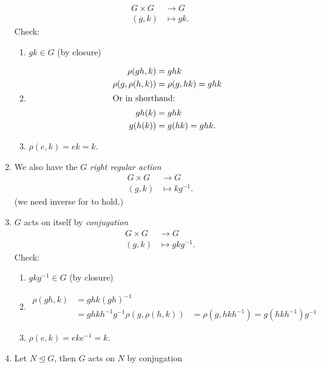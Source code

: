 \begin{example}
\begin{enumerate}
        \begin{align*}
            G \times G &\to G \\
            (g, k) &\mapsto gk.
        \end{align*} 
        Check:
        \begin{enumerate} \addtocounter{enumii}{-1}
            \item $gk \in G$ (by closure)
            \item
            \begin{align*}
                \rho(gh, k) &= ghk \\
                \rho(g, \rho(h, k)) &= \rho(g, hk) = ghk \\
                \intertext{Or in shorthand: }
                gh(k) &= ghk \\
                g(h(k)) &= g(hk) = ghk.
            \end{align*} 
            \item $\rho(e, k) = ek = k$.
        \end{enumerate} 
        \item We also have the $G$ \emph{right regular action}
        \begin{align*}
            G \times G &\to G \\
            (g, k) &\mapsto k g^{-1}.
        \end{align*} (we need inverse for  to hold.)
        \item $G$ acts on itself by \emph{conjugation}
        \begin{align*}
            G \times G &\to G \\
            (g, k) &\mapsto gkg^{-1}.
        \end{align*} 
        Check: 
        \begin{enumerate} \addtocounter{enumii}{-1}
            \item $gkg^{-1} \in G$ (by closure)
            \item
            \begin{align*}
                \rho(gh, k) &= ghk(gh)^{-1} \\
                &= gh k h^{-1} g^{-1}
                \rho(g, \rho(h, k)) &= \rho(g, hkh^{-1}) = g (h k h^{-1}) g^{-1}
            \end{align*} 
            \item $\rho(e, k) = ek e^{-1} = k$.
        \end{enumerate} 
        \item Let $N \trianglelefteq G$, then $G$ acts on $N$ by conjugation

\end{enumerate}
\end{example}
